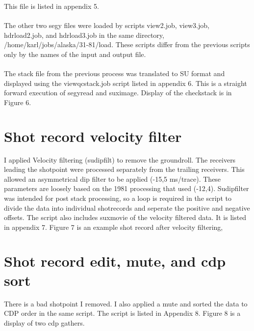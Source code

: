 This file is listed in appendix 5.\\
\\
The other two segy files were loaded by scripts view2.job, view3.job, hdrload2.job, and hdrload3.job in the same  directory, /home/karl/jobs/alaska/31-81/load.  These scripts differ from the previous scripts only by the names of the input and output file.\\
\\
The stack file from the previous process was translated to SU format and displayed using the viewqcstack.job script listed in appendix 6.  This is a straight forward execution of segyread and suximage.  Display of the checkstack is in Figure 6.\\


\section{Shot record velocity filter}
I applied Velocity filtering (sudipfilt) to remove the groundroll.  The receivers leading the shotpoint were processed separately from the trailing receivers.  This allowed an asymmetrical dip filter to be applied (-15,5 ms/trace).  These parameters are loosely based on the 1981 processing that used (-12,4). Sudipfilter was intended for post stack processing, so a loop is required in the script to divide the data into individual shotrecords and seperate the positive and negative offsets.  The script also includes suxmovie of the velocity filtered data.  It is listed in appendix 7.  Figure 7 is an example shot record after velocity filtering,\\


\section{Shot record edit, mute, and cdp sort}
There is a bad shotpoint I removed.  I also applied a mute  and sorted the data to CDP order in the same script.  The script is listed in Appendix 8.  Figure 8 is a display of two cdp gathers.\\


